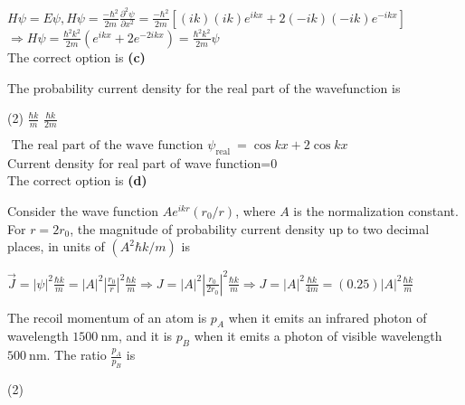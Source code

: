 \begin{enumerate}
\begin{answer}
		$H \psi=E \psi, H \psi=\frac{-\hbar^{2}}{2 m} \frac{\partial^{2} \psi}{\partial x^{2}}=\frac{-\hbar^{2}}{2 m}\left[(i k)(i k) e^{i k x}+2(-i k)(-i k) e^{-i k x}\right]$\\
		$\Rightarrow H \psi=\frac{\hbar^{2} k^{2}}{2 m}\left(e^{i k x}+2 e^{-2 i k x}\right)=\frac{\hbar^{2} k^{2}}{2 m} \psi$	\\
		The correct option is \textbf{(c)}
	\end{answer}
	\begin{minipage}{\textwidth}
		\item The probability current density for the real part of the wavefunction is
	\end{minipage}
	\begin{tasks}(2)
		\task[\textbf{B.}]$\frac{\hbar k}{m}$
		\task[\textbf{C.}]$\frac{\hbar k}{2 m}$
	\end{tasks}
	\begin{answer}
		$\text { The real part of the wave function } \psi_{\text {real }}=\cos k x+2 \cos k x$\\
		Current density for real part of wave function=0\\
		The correct option is \textbf{(d)}	
	\end{answer}
	\begin{minipage}{\textwidth}
		\item Consider the wave function $A e^{i k r}\left(r_{0} / r\right)$, where $A$ is the normalization constant.
		For $r=2 r_{0}$, the magnitude of probability current density up to two decimal places, in units of $\left(A^{2} \hbar k / m\right)$ is
	\end{minipage}
	\begin{answer}
		$\vec{J}=|\psi|^{2} \frac{\hbar k}{m}=|A|^{2}\left|\frac{r_{0}}{r}\right|^{2} \frac{\hbar k}{m} \Rightarrow J=|A|^{2}\left|\frac{r_{0}}{2 r_{0}}\right|^{2} \frac{\hbar k}{m} \Rightarrow J=|A|^{2} \frac{\hbar k}{4 m}=(0.25)|A|^{2} \frac{\hbar k}{m}$
	\end{answer}
	\begin{minipage}{\textwidth}
		\item The recoil momentum of an atom is $p_{A}$ when it emits an infrared photon of wavelength $1500 \mathrm{~nm}$, and it is $p_{B}$ when it emits a photon of visible wavelength $500 \mathrm{~nm}$. The ratio $\frac{p_{A}}{p_{B}}$ is
	\end{minipage}
	\begin{tasks}(2)

\end{tasks}
\end{enumerate}

